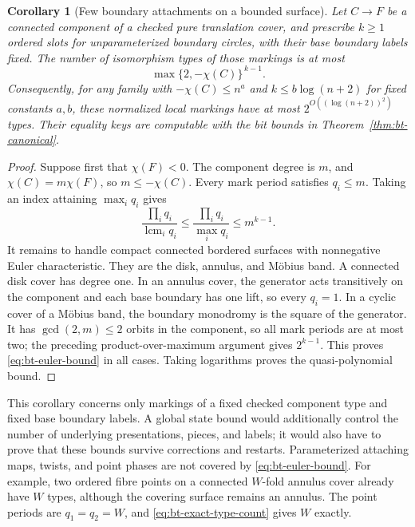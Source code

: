 \documentclass[11pt]{article}
\newtheorem{corollary}[theorem]{Corollary}
\theoremstyle{definition}
\theoremstyle{remark}
\newcommand{\lcm}{\operatorname{lcm}}
\begin{document}
\begin{corollary}[Few boundary attachments on a bounded surface]\label{cor:bt-genus-bound}
Let $C\to F$ be a connected component of a checked pure translation cover,
and prescribe $k\ge1$ ordered slots for unparameterized boundary circles,
with their base boundary labels fixed.  The number of isomorphism types
of those markings is at most
\begin{equation}\label{eq:bt-euler-bound}
 \max\{2,-\chi(C)\}^{\,k-1}.
\end{equation}
Consequently, for any family with $-\chi(C)\le n^a$ and
$k\le b\log(n+2)$ for fixed constants $a,b$, these normalized local
markings have at most $2^{O((\log(n+2))^2)}$ types.  Their equality keys
are computable with the bit bounds in Theorem~\ref{thm:bt-canonical}.
\end{corollary}
\begin{proof}
Suppose first that $\chi(F)<0$.  The component degree is $m$, and
$\chi(C)=m\chi(F)$, so $m\le-\chi(C)$.  Every mark period satisfies
$q_i\le m$.  Taking an index attaining $\max_iq_i$ gives
\[
 \frac{\prod_iq_i}{\lcm_iq_i}
 \le \frac{\prod_iq_i}{\max_iq_i}
 \le m^{k-1}.
\]
It remains to handle compact connected bordered surfaces with
nonnegative Euler characteristic.  They are the disk, annulus, and
M\"obius band.  A connected disk cover has degree one.  In an annulus
cover, the generator acts transitively on the component and each base
boundary has one lift, so every $q_i=1$.  In a cyclic cover of a
M\"obius band, the boundary monodromy is the square of the generator.
It has $\gcd(2,m)\le2$ orbits in the component, so all mark periods are
at most two; the preceding product-over-maximum argument gives
$2^{k-1}$.  This proves \eqref{eq:bt-euler-bound} in all cases.
Taking logarithms proves the quasi-polynomial bound.
\end{proof}

This corollary concerns only markings of a fixed checked component type
and fixed base boundary labels.  A global state bound would additionally
control the number of underlying presentations, pieces, and labels; it
would also have to prove that these bounds survive corrections and
restarts.  Parameterized attaching maps, twists, and point phases are
not covered by \eqref{eq:bt-euler-bound}.  For example, two ordered fibre
points on a connected $W$-fold annulus cover already have $W$ types,
although the covering surface remains an annulus.  The point periods are
$q_1=q_2=W$, and \eqref{eq:bt-exact-type-count} gives $W$ exactly.
\end{document}
